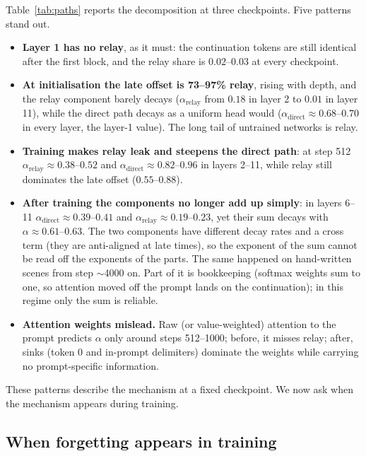 \documentclass[11pt]{article}
\theoremstyle{definition}
\theoremstyle{remark}
\begin{document}
Table~\ref{tab:paths} reports the decomposition at three checkpoints. Five patterns stand out.

\begin{itemize}
  \item \textbf{Layer 1 has no relay}, as it must: the continuation tokens are still identical after the first block, and the relay share is $0.02$--$0.03$ at every checkpoint.
  \item \textbf{At initialisation the late offset is 73--97\% relay}, rising with depth, and the relay component barely decays ($\alpha_{\text{relay}}$ from $0.18$ in layer 2 to $0.01$ in layer 11), while the direct path decays as a uniform head would ($\alpha_{\text{direct}}\approx0.68$--$0.70$ in every layer, the layer-1 value). The long tail of untrained networks is relay.
  \item \textbf{Training makes relay leak and steepens the direct path}: at step 512 $\alpha_{\text{relay}}\approx0.38$--$0.52$ and $\alpha_{\text{direct}}\approx0.82$--$0.96$ in layers 2--11, while relay still dominates the late offset ($0.55$--$0.88$).
  \item \textbf{After training the components no longer add up simply}: in layers 6--11 $\alpha_{\text{direct}}\approx0.39$--$0.41$ and $\alpha_{\text{relay}}\approx0.19$--$0.23$, yet their sum decays with $\alpha\approx0.61$--$0.63$. The two components have different decay rates and a cross term (they are anti-aligned at late times), so the exponent of the sum cannot be read off the exponents of the parts. The same happened on hand-written scenes from step $\sim$4000 on. Part of it is bookkeeping (softmax weights sum to one, so attention moved off the prompt lands on the continuation); in this regime only the sum is reliable.
  \item \textbf{Attention weights mislead.} Raw (or value-weighted) attention to the prompt predicts $\alpha$ only around steps 512--1000; before, it misses relay; after, sinks (token 0 and in-prompt delimiters) dominate the weights while carrying no prompt-specific information.
\end{itemize}

These patterns describe the mechanism at a fixed checkpoint. We now ask when the mechanism appears during training.

\subsection{When forgetting appears in training}\label{sec:mech-training}
\end{document}
